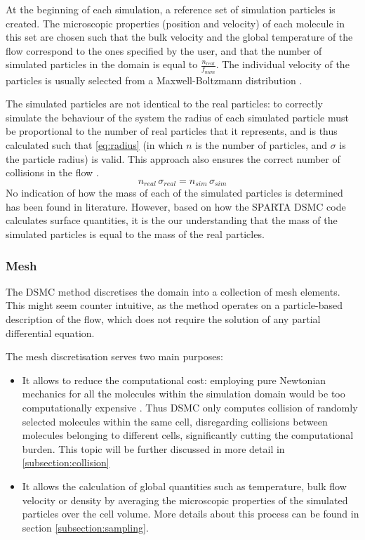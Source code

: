At the beginning of each simulation, a reference set of simulation particles is created. The microscopic properties (position and velocity) of each molecule in this set are chosen such that the bulk velocity and the global temperature of the flow correspond to the ones specified by the user, and that the number of simulated particles in the domain is equal to $\frac{n_{real}}{f_{num}}$. The individual velocity of the particles is usually selected from a Maxwell-Boltzmann distribution \cite{natodsmc}.

The simulated particles are not identical to the real particles: to correctly simulate the behaviour of the system the radius of each simulated particle must be proportional to the number of real particles that it represents, and is thus calculated such that \autoref{eq:radius} (in which $n$ is the number of particles, and $\sigma$ is the particle radius) is valid. This approach also ensures the correct number of collisions in the flow \cite{dsmcnotes}.
\begin{equation}
    n_{real}\, \sigma_{real} = n_{sim}\, \sigma_{sim}
    \label{eq:radius}
\end{equation}
No indication of how the mass of each of the simulated particles is determined has been found in literature. However, based on how the SPARTA DSMC code calculates surface quantities, it is the our understanding that the mass of the simulated particles is equal to the mass of the real particles.

\subsubsection{Mesh}
The DSMC method discretises the domain into a collection of mesh elements. This might seem counter intuitive, as the method operates on a particle-based description of the flow, which does not require the solution of any partial differential equation.

The mesh discretisation serves two main purposes: 

\begin{itemize}
    \item It allows to reduce the computational cost: employing pure Newtonian mechanics for all the molecules within the simulation domain would be too computationally expensive \cite{themontecarlo}. Thus DSMC only computes collision of randomly selected molecules within the same cell, disregarding collisions between molecules belonging to different cells, significantly cutting the computational burden. This topic will be further discussed in more detail in \autoref{subsection:collision}
    \item It allows the calculation of global quantities such as temperature, bulk flow velocity or density by averaging the microscopic properties of the simulated particles over the cell volume. More details about this process can be found in section \autoref{subsection:sampling}.
\end{itemize}

